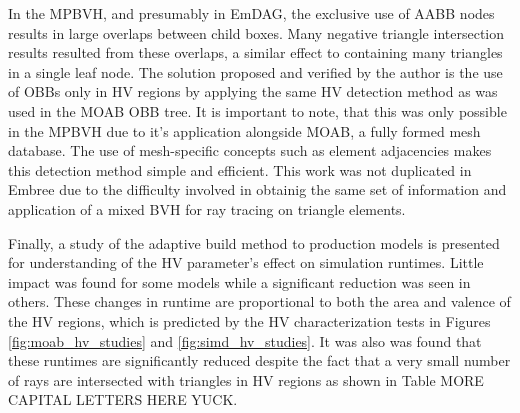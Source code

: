 In the MPBVH, and presumably in EmDAG, the exclusive use of AABB nodes results
in large overlaps between child boxes. Many negative triangle intersection
results resulted from these overlaps, a similar effect to containing many
triangles in a single leaf node. The solution proposed and verified by the
author is the use of OBBs only in HV regions by applying the same HV detection
method as was used in the MOAB OBB tree. It is important to note, that this was
only possible in the MPBVH due to it's application alongside MOAB, a fully
formed mesh database. The use of mesh-specific concepts such as element
adjacencies makes this detection method simple and efficient. This work was not
duplicated in Embree due to the difficulty involved in obtainig the same set of
information and application of a mixed BVH for ray tracing on triangle elements.

Finally, a study of the adaptive build method to production models is presented
for understanding of the HV parameter's effect on simulation runtimes. Little
impact was found for some models while a significant reduction was seen in
others. These changes in runtime are proportional to both the area and valence
of the HV regions, which is predicted by the HV characterization tests in
Figures \ref{fig:moab_hv_studies} and \ref{fig:simd_hv_studies}. It was also was
found that these runtimes are significantly reduced despite the fact that a very
small number of rays are intersected with triangles in HV regions as shown in
Table MORE CAPITAL LETTERS HERE YUCK.
